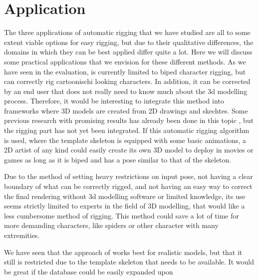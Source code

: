 \documentclass{article}
\begin{document}



\section{Application}
The three applications of automatic rigging that we have studied are all to some
extent viable options for easy rigging, but due to their qualitative differences, 
the domains in which they can be best applied differ quite a lot.
Here we will discuss some practical applications that we envision for these
different methods.
As we have seen in the evaluation, \citep{paper1} is currently limited to biped
character rigging, but can correctly rig cartoonischi looking  characters. In addition, it can be
corrected by an end user that does not really need to know much about the 3d
modelling process. Therefore, it would be interesting to integrate this method into
frameworks where 3D models are created from 2D drawings and skechtes. Some
previous research with promising results has already been done in this topic
\citep{paper4}, but the rigging part has not yet been integrated. If this automatic rigging
algorithm is used, where the template skeleton is equipped with some basic
animations, a 2D artist of any kind could easily create its own 3D model to
deploy in movies or games as long as it is biped and has a pose similar to that
of the skeleton.

Due to the method of \citep{paper2} setting heavy restrictions on input pose,
not having a clear boundary of what can be correctly rigged, and not
having an easy way to correct the final rendering without 3d modelling software
or limited knowledge, its use seems strictly limited to experts in the field of 3D
modelling, that would like a less cumbersome method of rigging. This method
could save a lot of time for more demanding characters, like spiders or other
character with many extremities.

We have seen that the approach of \citep{paper3} works best for realistic
models, but that it still is restricted due to the template skeleton that needs
to be available. It would be great if the database could be easily expanded upon
\end{document}
